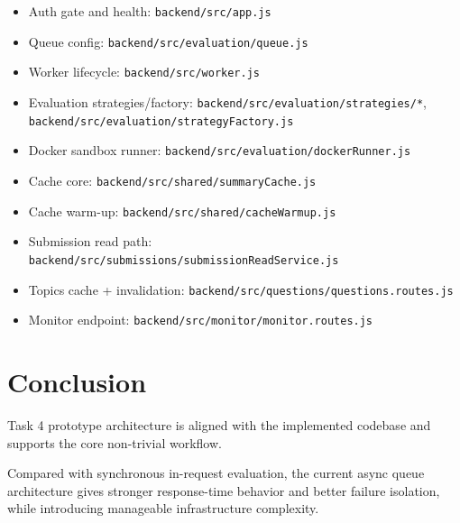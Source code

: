 \documentclass[12pt,journal,onecolumn]{IEEEtran}
\begin{document}
\begin{itemize}
    \item Auth gate and health: \texttt{backend/src/app.js}
    \item Queue config: \texttt{backend/src/evaluation/queue.js}
    \item Worker lifecycle: \texttt{backend/src/worker.js}
    \item Evaluation strategies/factory: \texttt{backend/src/evaluation/strategies/*}, \texttt{backend/src/evaluation/strategyFactory.js}
    \item Docker sandbox runner: \texttt{backend/src/evaluation/dockerRunner.js}
    \item Cache core: \texttt{backend/src/shared/summaryCache.js}
    \item Cache warm-up: \texttt{backend/src/shared/cacheWarmup.js}
    \item Submission read path: \texttt{backend/src/submissions/submissionReadService.js}
    \item Topics cache + invalidation: \texttt{backend/src/questions/questions.routes.js}
    \item Monitor endpoint: \texttt{backend/src/monitor/monitor.routes.js}
\end{itemize}

\section{Conclusion}

Task 4 prototype architecture is aligned with the implemented codebase and supports the core non-trivial workflow.

Compared with synchronous in-request evaluation, the current async queue architecture gives stronger response-time behavior and better failure isolation, while introducing manageable infrastructure complexity.
\end{document}
